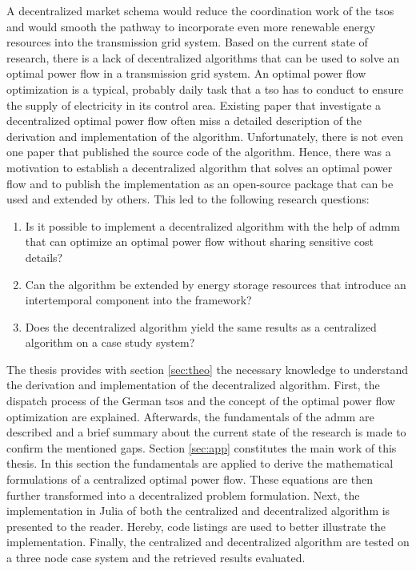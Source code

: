 A decentralized market schema would reduce the coordination work of the \glspl{tso} and would smooth the pathway to incorporate even more renewable energy resources into the transmission grid system. Based on the current state of research, there is a lack of decentralized algorithms that can be used to solve an optimal power flow in a transmission grid system. An optimal power flow optimization is a typical, probably daily task that a \gls{tso} has to conduct to ensure the supply of electricity in its control area. Existing paper that investigate a decentralized optimal power flow often miss a detailed description of the derivation and implementation of the algorithm. Unfortunately, there is not even one paper that published the source code of the algorithm. Hence, there was a motivation to establish a decentralized algorithm that solves an optimal power flow and to publish the implementation as an open-source package that can be used and extended by others. This led to the following research questions:

\begin{enumerate}
	\item Is it possible to implement a decentralized algorithm with the help of \gls{admm} that can optimize an optimal power flow without sharing sensitive cost details?
	\item Can the algorithm be extended by energy storage resources that introduce an intertemporal component into the framework?
	\item Does the decentralized algorithm yield the same results as a centralized algorithm on a case study system?
\end{enumerate}

The thesis provides with section \ref{sec:theo} the necessary knowledge to understand the derivation and implementation of the decentralized algorithm. First, the dispatch process of the German \glspl{tso} and the concept of the optimal power flow optimization are explained. Afterwards, the fundamentals of the \gls{admm} are described and a brief summary about the current state of the research is made to confirm the mentioned gaps. Section \ref{sec:app} constitutes the main work of this thesis. In this section the fundamentals are applied to derive the mathematical formulations of a centralized optimal power flow. These equations are then further transformed into a decentralized problem formulation. Next, the implementation in Julia of both the centralized and decentralized algorithm is presented to the reader. Hereby, code listings are used to better illustrate the implementation. Finally, the centralized and decentralized algorithm are tested on a three node case system and the retrieved results evaluated.



